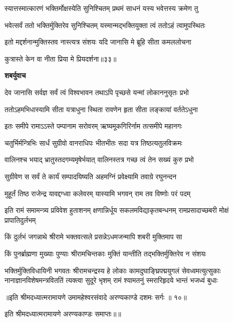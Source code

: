 \twolineshloka
{स्यात्तस्मात्कारणं भक्तिर्मोक्षस्येति सुनिश्चितम्}
{प्रथमं साधनं यस्य भवेत्तस्य क्रमेण तु} %

\twolineshloka
{भवेत्सर्वं ततो भक्तिर्मुक्तिरेव सुनिश्चितम्}
{यस्मान्मद्भक्तियुक्ता त्वं ततोऽहं त्वामुपस्थितः} %

\twolineshloka
{इतो मद्दर्शनान्मुक्तिस्तव नास्त्यत्र संशयः}
{यदि जानासि मे ब्रूहि सीता कमललोचना} %

{कुत्रास्ते केन वा नीता प्रिया मे प्रियदर्शना॥३३॥} %


\textbf{शबर्युवाच}

\twolineshloka
{देव जानासि सर्वज्ञ सर्वं त्वं विश्वभावन}
{तथाऽपि पृच्छसे यन्मां लोकाननुसृतः प्रभो} %

\twolineshloka
{ततोऽहमभिधास्यामि सीता यत्राधुना स्थिता}
{रावणेन हृता सीता लङ्कायां वर्ततेऽधुना} %

\twolineshloka
{इतः समीपे रामाऽऽस्ते पम्पानाम सरोवरम्}
{ऋष्यमूकगिरिर्नाम तत्समीपे महानगः} %

\twolineshloka
{चतुर्भिर्मन्त्रिभिः सार्धं सुग्रीवो वानराधिपः}
{भीतभीतः सदा यत्र तिष्ठत्यतुलविक्रमः} %

\twolineshloka
{वालिनश्च भयाद् भ्रातुस्तदगम्यमृषेर्भयात्}
{वालिनस्तत्र गच्छ त्वं तेन सख्यं कुरु प्रभो} %

\twolineshloka
{सुग्रीवेण स सर्वं ते कार्यं सम्पादयिष्यति}
{अहमग्निं प्रवेक्ष्यामि तवाग्रे रघुनन्दन} %

\twolineshloka
{मुहूर्तं तिष्ठ राजेन्द्र यावद्दग्ध्वा कलेवरम्}
{यास्यामि भगवन् राम तव विष्णोः परं पदम्} %

\threelineshloka
{इति रामं समामन्त्र्य प्रविवेश हुताशनम्}
{क्षणान्निर्धूय सकलमविद्याकृतबन्धनम्}
{रामप्रसादाच्छबरी मोक्षं प्रापातिदुर्लभम्} %

\twolineshloka
{किं दुर्लभं जगन्नाथे श्रीरामे भक्तवत्सले}
{प्रसन्नेऽधमजन्मापि शबरी मुक्तिमाप सा} %

\twolineshloka
{किं पुनर्ब्राह्मणा मुख्याः पुण्याः श्रीरामचिन्तकाः}
{मुक्तिं यान्तीति तद्भक्तिर्मुक्तिरेव न संशयः} %

\fourlineindentedshloka
{भक्तिर्मुक्तिविधायिनी भगवतः श्रीरामचन्द्रस्य हे}
{लोकाः कामदुघाङ्घ्रिपद्मयुगलं सेवध्वमत्युत्सुकाः}
{नानाज्ञानविशेषमन्त्रविततिं त्यक्त्वा सुदूरे भृशम्}
{रामं श्यामतनुं स्मरारिहृदये भान्तं भजध्वं बुधाः} %

{॥इति श्रीमदध्यात्मरामायणे उमामहेश्वरसंवादे
अरण्यकाण्डे दशमः सर्गः ॥ १०॥
}

इति श्रीमदध्यात्मरामायणे अरण्यकाण्डः समाप्तः॥॥
